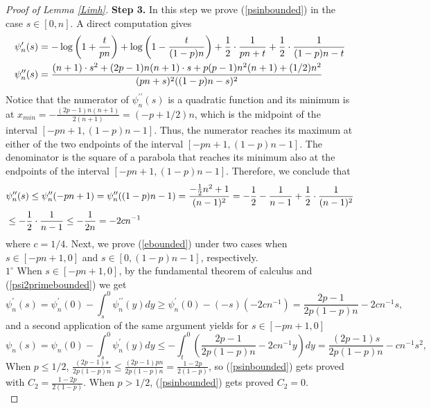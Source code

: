 \begin{proof}[Proof of Lemma \ref{Limh}]
\textbf{Step 3.} In this step we prove (\ref{psinbounded}) in the case $s\in[0,n]$. A direct computation gives
\begin{equation}{\label{CompDerivative}}
\begin{split}
	& \psi_{n}^{\prime}(s)=-\log\left(1+\frac{t}{pn}\right)+\log\left(1-\frac{t}{(1-p)n}\right)+\frac{1}{2}\cdot\frac{1}{pn+t}+\frac{1}{2}\cdot\frac{1}{(1-p)n-t}\\
	& \psi_{n}^{\prime\prime}(s)=\frac{(n+1)\cdot s^2+(2p-1)n(n+1)\cdot s+p(p-1)n^2(n+1)+(1/2)n^2}{(pn+s)^2((1-p)n-s)^2}
\end{split}
\end{equation}
Notice that the numerator of $\psi_{n}^{\prime\prime}(s)$ is a quadratic function and its minimum is at $x_{min}=-\frac{(2p-1)n(n+1)}{2(n+1)}=(-p+1/2)n$, which is the midpoint of the interval $[-pn+1,(1-p)n-1]$. Thus, the numerator reaches its maximum at either of the two endpoints of the interval $[-pn+1,(1-p)n-1]$. The denominator is the square of a parabola that reaches its minimum also at the endpoints of the interval $[-pn+1,(1-p)n-1]$. Therefore, we conclude that 
\begin{equation}{\label{psi2primebounded}}
\begin{split}
	& \psi_{n}^{\prime\prime}(s)\leq \psi_{n}^{\prime\prime}(-pn+1)=\psi_{n}^{\prime\prime}((1-p)n-1)=\frac{-\frac{1}{2}n^2+1}{(n-1)^2}=-\frac{1}{2} -\frac{1}{n-1}+\frac{1}{2}\cdot\frac{1}{(n-1)^2}\\
	& \leq -\frac{1}{2}\cdot\frac{1}{n-1}\leq -\frac{1}{2n}=-2cn^{-1}
\end{split}
\end{equation}
where $c=1/4$. Next, we prove (\ref{ebounded}) under two cases when $s\in[-pn+1,0]$ and $s\in [0,(1-p)n-1]$, respectively. \\
$1^{\circ}$ When $s\in[-pn+1,0]$, by the fundamental theorem of calculus and (\ref{psi2primebounded}) we get 
\begin{equation*}
	\psi_{n}^{\prime}(s)=\psi_{n}^{\prime}(0)-\int_{s}^{0}\psi_{n}^{\prime\prime}(y)dy\geq \psi_{n}^{\prime}(0)-(-s)(-2cn^{-1})=\frac{2p-1}{2p(1-p)n}-2cn^{-1}s,
\end{equation*}
and a second application of the same argument yields for $s\in[-pn+1,0]$
\begin{equation*}
	\psi_{n}(s)=\psi_{n}(0)-\int_{s}^{0}\psi_{n}^{\prime}(y)dy\leq -\int_{t}^{0}\left(\frac{2p-1}{2p(1-p)n}-2cn^{-1}y\right) dy=\frac{(2p-1)s}{2p(1-p)n}-cn^{-1}s^2,
\end{equation*}
When $p\leq 1/2$, $\frac{(2p-1)s}{2p(1-p)n}\leq \frac{(2p-1)pn}{2p(1-p)n}=\frac{1-2p}{2(1-p)}$, so (\ref{psinbounded}) gets proved with $C_{2}=\frac{1-2p}{2(1-p)}$. When $p>1/2$, (\ref{psinbounded}) gets proved $C_{2}=0$.\\

\end{proof}
